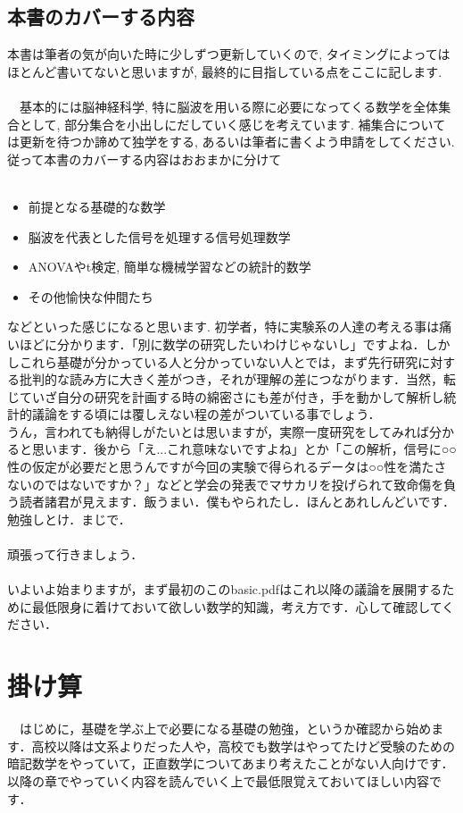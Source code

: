 \documentclass[11pt,a4paper,uplatex]{ujreport}
\begin{document}
\section{本書のカバーする内容}
本書は筆者の気が向いた時に少しずつ更新していくので, タイミングによってはほとんど書いてないと思いますが, 最終的に目指している点をここに記します.\\
\\
　基本的には脳神経科学, 特に脳波を用いる際に必要になってくる数学を全体集合として, 部分集合を小出しにだしていく感じを考えています. 補集合については更新を待つか諦めて独学をする, あるいは筆者に書くよう申請をしてください. 従って本書のカバーする内容はおおまかに分けて\\
\\
\begin{screen}
\begin{itemize}
 \item 前提となる基礎的な数学
 \item 脳波を代表とした信号を処理する信号処理数学
 \item ANOVAやt検定, 簡単な機械学習などの統計的数学
 \item その他愉快な仲間たち
\end{itemize}
\end{screen}

などといった感じになると思います. 初学者，特に実験系の人達の考える事は痛いほどに分かります．「別に数学の研究したいわけじゃないし」ですよね．しかしこれら基礎が分かっている人と分かっていない人とでは，まず先行研究に対する批判的な読み方に大きく差がつき，それが理解の差につながります．当然，転じていざ自分の研究を計画する時の綿密さにも差が付き，手を動かして解析し統計的議論をする頃には覆しえない程の差がついている事でしょう．\\
うん，言われても納得しがたいとは思いますが，実際一度研究をしてみれば分かると思います．後から「え...これ意味ないですよね」とか「この解析，信号に○○性の仮定が必要だと思うんですが今回の実験で得られるデータは○○性を満たさないのではないですか？」などと学会の発表でマサカリを投げられて致命傷を負う読者諸君が見えます．飯うまい．僕もやられたし．ほんとあれしんどいです．勉強しとけ．まじで．\\
\\
頑張って行きましょう．
\\
\\
いよいよ始まりますが，まず最初のこのbasic.pdfはこれ以降の議論を展開するために最低限身に着けておいて欲しい数学的知識，考え方です．心して確認してください．
\chapter{掛け算}
　はじめに，基礎を学ぶ上で必要になる基礎の勉強，というか確認から始めます．高校以降は文系よりだった人や，高校でも数学はやってたけど受験のための暗記数学をやっていて，正直数学についてあまり考えたことがない人向けです．以降の章でやっていく内容を読んでいく上で最低限覚えておいてほしい内容です．
\end{document}
